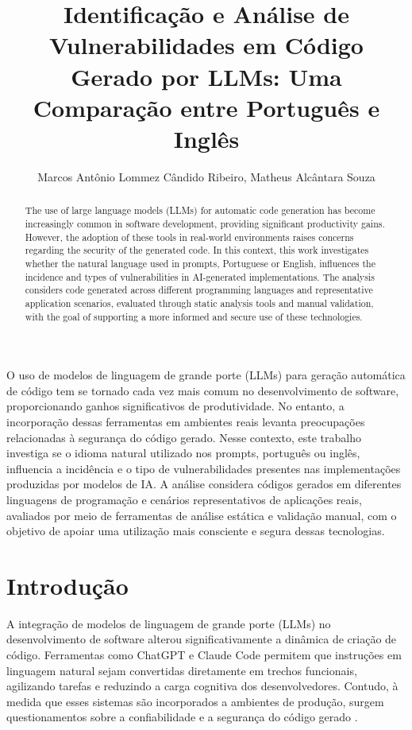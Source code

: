 \documentclass[12pt]{article}
\title{Identificação e Análise de Vulnerabilidades em Código Gerado por LLMs: Uma Comparação entre Português e Inglês}
\author{Marcos Antônio Lommez Cândido Ribeiro\inst{1}, Matheus Alcântara Souza\inst{2} }
\begin{document}
 

\maketitle

\begin{abstract}
The use of large language models (LLMs) for automatic code generation has become increasingly common in software development, providing significant productivity gains. However, the adoption of these tools in real-world environments raises concerns regarding the security of the generated code. In this context, this work investigates whether the natural language used in prompts, Portuguese or English, influences the incidence and types of vulnerabilities in AI-generated implementations. The analysis considers code generated across different programming languages and representative application scenarios, evaluated through static analysis tools and manual validation, with the goal of supporting a more informed and secure use of these technologies.
\end{abstract}
     
\begin{resumo}
O uso de modelos de linguagem de grande porte (LLMs) para geração automática de código tem se tornado cada vez mais comum no desenvolvimento de software, proporcionando ganhos significativos de produtividade. No entanto, a incorporação dessas ferramentas em ambientes reais levanta preocupações relacionadas à segurança do código gerado. Nesse contexto, este trabalho investiga se o idioma natural utilizado nos prompts, português ou inglês, influencia a incidência e o tipo de vulnerabilidades presentes nas implementações produzidas por modelos de IA. A análise considera códigos gerados em diferentes linguagens de programação e cenários representativos de aplicações reais, avaliados por meio de ferramentas de análise estática e validação manual, com o objetivo de apoiar uma utilização mais consciente e segura dessas tecnologias.
\end{resumo}

\section{Introdução}

A integração de modelos de linguagem de grande porte (LLMs) no desenvolvimento de software alterou significativamente a dinâmica de criação de código. Ferramentas como ChatGPT e Claude Code permitem que instruções em linguagem natural sejam convertidas diretamente em trechos funcionais, agilizando tarefas e reduzindo a carga cognitiva dos desenvolvedores. Contudo, à medida que esses sistemas são incorporados a ambientes de produção, surgem questionamentos sobre a confiabilidade e a segurança do código gerado \cite{pearce2021asleepkeyboardassessingsecurity}.
\end{document}
